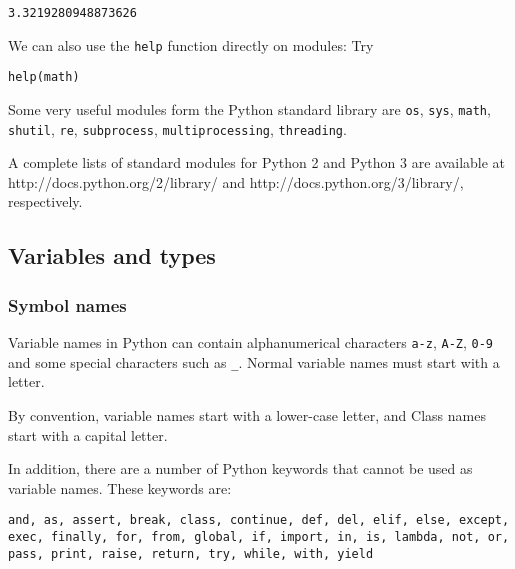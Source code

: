 \documentclass[11pt]{article}
\makeatletter
\newcommand{\boxspacing}{\kern\kvtcb@left@rule\kern\kvtcb@boxsep}
\newcommand{\prompt}[4]{
        \ttfamily\llap{{\color{#2}[#3]:\hspace{3pt}#4}}\vspace{-\baselineskip}
    }
\makeatother
\begin{document}
            \begin{tcolorbox}[breakable, size=fbox, boxrule=.5pt, pad at break*=1mm, opacityfill=0]
\prompt{Out}{outcolor}{13}{\boxspacing}
\begin{Verbatim}[commandchars=\\\{\}]
3.3219280948873626
\end{Verbatim}
\end{tcolorbox}
        
    We can also use the \texttt{help} function directly on modules: Try

\begin{verbatim}
help(math) 
\end{verbatim}

Some very useful modules form the Python standard library are
\texttt{os}, \texttt{sys}, \texttt{math}, \texttt{shutil}, \texttt{re},
\texttt{subprocess}, \texttt{multiprocessing}, \texttt{threading}.

A complete lists of standard modules for Python 2 and Python 3 are
available at http://docs.python.org/2/library/ and
http://docs.python.org/3/library/, respectively.

    \hypertarget{variables-and-types}{%
\subsection{Variables and types}\label{variables-and-types}}

    \hypertarget{symbol-names}{%
\subsubsection{Symbol names}\label{symbol-names}}

    Variable names in Python can contain alphanumerical characters
\texttt{a-z}, \texttt{A-Z}, \texttt{0-9} and some special characters
such as \texttt{\_}. Normal variable names must start with a letter.

By convention, variable names start with a lower-case letter, and Class
names start with a capital letter.

In addition, there are a number of Python keywords that cannot be used
as variable names. These keywords are:

\begin{verbatim}
and, as, assert, break, class, continue, def, del, elif, else, except, 
exec, finally, for, from, global, if, import, in, is, lambda, not, or,
pass, print, raise, return, try, while, with, yield
\end{verbatim}
\end{document}

